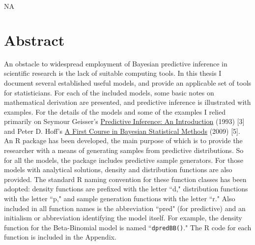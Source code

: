\documentclass[12pt, a4paper]{article}
\begin{document}
\vspace{1cm}

NA

\vspace{1cm}


\clearpage



\tableofcontents
\listoffigures
\newpage


\section{Abstract}

An obstacle to widespread employment of Bayesian predictive inference in scientific research is the lack of suitable computing tools.  In this thesis I document several established useful models, and provide an applicable set of tools for statisticians.  For each of the included models, some basic notes on mathematical derivation are presented, and predictive inference is illustrated with examples.  For the details of the models and some of the examples I relied primarily on Seymour Geisser's \underline{Predictive Inference:  An Introduction} (1993) [3] and Peter D. Hoff's \underline{A First Course in Bayesian Statistical Methods} (2009) [5].\\

\noindent An R package has been developed, the main purpose of which is to provide the researcher with a means of generating samples from predictive distributions.  So for all the models, the package includes predictive sample generators.  For those models with analytical solutions, density and distribution functions are also provided.  The standard R naming convention for these function classes has been adopted:  density functions are prefixed with the letter ``d," distribution functions with the letter ``p," and sample generation functions with the letter ``r."  Also included in all function names is the abbreviation ``pred" (for predictive) and an initialism or abbreviation identifying the model itself.  For example, the density function for the Beta-Binomial model is named ``\texttt{dpredBB()}."  The R code for each function is included in the Appendix.
\end{document}
